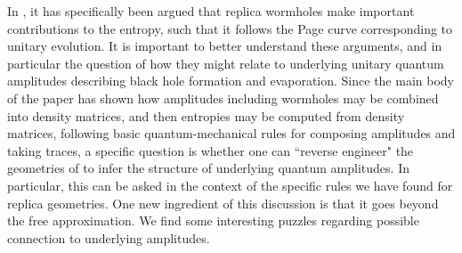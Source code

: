 \documentclass[12pt]{article}
\numberwithin{equation}{section}
\begin{document}
In \cite{Penington:2019kki, Almheiri:2019qdq}, it has specifically been argued that replica wormholes make important contributions to the entropy, such that it follows the Page curve corresponding to unitary evolution.  It is important to better understand these arguments, and in particular the question of how they might relate  to underlying unitary quantum amplitudes describing black hole formation and evaporation.  Since the main body of the paper has shown how amplitudes including wormholes may be combined into density matrices, and then entropies may be computed from density matrices, following basic quantum-mechanical rules for composing amplitudes and taking traces, a specific question is whether one can ``reverse engineer" the geometries of 
\cite{Penington:2019kki, Almheiri:2019qdq} to infer the structure of underlying quantum amplitudes.  In particular, this can be asked in the context of the specific rules we have found for replica geometries.  One new ingredient of this discussion is that it goes beyond the free approximation.  We find some interesting puzzles regarding possible connection to underlying amplitudes.
\end{document}
